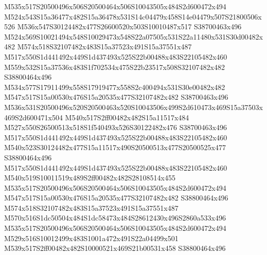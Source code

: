 \documentclass{article}
\begin{document}
\begin{multicols}{2}


M535x517S20500496x506S20500464x506S10043505x484S2d600472x494 M524x543S15a36477x482S15a36478x531S14c04479x458S14e04479x507S21800506x526 M536x547S30124482x477S26600520x503S10010487x517 S38700463x496 M524x569S10021494x548S10029473x548S22a07505x531S22a11480x531S30d00482x482 M574x518S32107482x483S15a37523x491S15a37551x487 M517x550S1d441492x449S1d437493x525S22b00488x483S22105482x460 M559x532S15a37536x483S1f702534x475S22b23517x508S32107482x482 S38800464x496 M534x577S17911499x558S17919477x558S2c400494x531S30e00482x482 M547x517S15a00530x476S15a20535x477S32107482x482 S38700463x496 M536x531S20500496x520S20500463x520S10043506x499S2d610473x469S15a37503x469S2d600471x504 M540x517S2ff00482x482S15a11517x484 M527x550S26500513x518S1f540493x526S30122482x476 S38700463x496 M517x550S1d441492x449S1d437493x525S22b00488x483S22105482x460 M540x523S30124482x477S15a11517x490S20500513x477S20500525x477 S38800464x496 M517x550S1d441492x449S1d437493x525S22b00488x483S22105482x460 M540x519S10011519x489S2ff00482x482S28108514x455 M535x517S20500496x506S20500464x506S10043505x484S2d600472x494 M547x517S15a00530x476S15a20535x477S32107482x482 S38800464x496 M574x518S32107482x483S15a37523x491S15a37551x487 M570x516S1dc50504x484S1dc58473x484S28612430x496S2860a533x496 M535x517S20500496x506S20500464x506S10043505x484S2d600472x494 M529x516S10012499x483S1001a472x491S22a04499x501 M539x517S2ff00482x482S10000521x469S21b00531x458 S38800464x496






\end{multicols}
\end{document}
